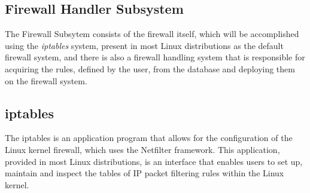 \begin{enumerate}




\section{Firewall Handler Subsystem}
\label{chap4:sec:firewall-sys}
The Firewall Subsytem consists of the firewall itself, which will be
accomplished using the \emph{iptables} system, present in most Linux
distributions as the default firewall system, and there is also a firewall
handling system that is responsible for acquiring the rules, defined by the
user, from the database and deploying them on the firewall system.

\subsection{iptables}
\label{chap4:sec:firewall-sys:sub:iptables}
The iptables is an application program that allows for the configuration of the
Linux kernel firewall, which uses the Netfilter framework. This application,
provided in most Linux distributions, is an interface that enables users to
set up, maintain and inspect the tables of IP packet filtering rules within the
Linux kernel.


\end{enumerate}
